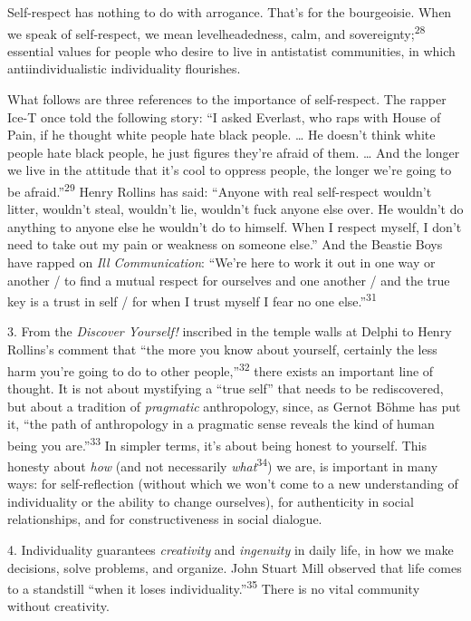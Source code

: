 Self-respect has nothing to do with arrogance. That’s for the bourgeoisie. When
we speak of self-respect, we mean levelheadedness, calm, and
sovereignty;\textsuperscript{28} essential values for people who desire to live
in antistatist communities, in which antiindividualistic individuality
flourishes.

What follows are three references to the importance of self-respect. The rapper
Ice-T once told the following story: “I asked Everlast, who raps with House of
Pain, if he thought white people hate black people. … He doesn’t think white
people hate black people, he just figures they’re afraid of them. … And the
longer we live in the attitude that it’s cool to oppress people, the longer
we’re going to be afraid.”\textsuperscript{29} Henry Rollins has said: “Anyone
with real self-respect wouldn’t litter, wouldn’t steal, wouldn’t lie, wouldn’t
fuck anyone else over. He wouldn’t do anything to anyone else he wouldn’t do to
himself. When I respect myself, I don’t need to take out my pain or weakness on
someone else.” And the Beastie Boys have rapped on \textit{Ill Communication}:
“We’re here to work it out in one way or another / to find a mutual respect for
ourselves and one another / and the true key is a trust in self / for when I
trust myself I fear no one else.”\textsuperscript{31}

3. From the \textit{Discover Yourself!} inscribed in the temple walls at Delphi
to Henry Rollins’s comment that “the more you know about yourself, certainly the
less harm you’re going to do to other people,”\textsuperscript{32} there exists
an important line of thought. It is not about mystifying a “true self” that
needs to be rediscovered, but about a tradition of \textit{pragmatic}
anthropology, since, as Gernot Böhme has put it, “the path of anthropology in a
pragmatic sense reveals the kind of human being you are.”\textsuperscript{33}
In simpler terms, it’s about being honest to yourself. This honesty about
\textit{how} (and not necessarily \textit{what}\textsuperscript{34}) we are, is
important in many ways: for self-reflection (without which we won’t come to a
new understanding of individuality or the ability to change ourselves), for
authenticity in social relationships, and for constructiveness in social
dialogue.

4. Individuality guarantees \textit{creativity} and \textit{ingenuity} in daily
life, in how we make decisions, solve problems, and organize. John Stuart Mill
observed that life comes to a standstill “when it loses
individuality.”\textsuperscript{35} There is no vital community without
creativity.

